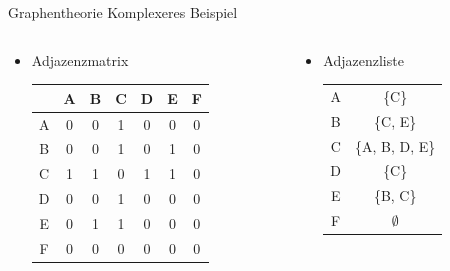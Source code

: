\documentclass[aspectratio=169]{beamer}
\begin{document}
\begin{frame}{Graphentheorie}
    \Large Komplexeres Beispiel \normalsize
    \vspace{0.5cm}
    \begin{columns}
        \begin{column}{0.4\textwidth}
            \begin{itemize}
                \item Adjazenzmatrix
                \begin{table}[]
                    \centering
                    \begin{tabular}{c|c c c c c c}
                         & A & B & C & D & E & F \\
                         \hline
                        A & 0 & 0 & 1 & 0 & 0 & 0 \\
                        B & 0 & 0 & 1 & 0 & 1 & 0 \\
                        C & 1 & 1 & 0 & 1 & 1 & 0 \\
                        D & 0 & 0 & 1 & 0 & 0 & 0 \\
                        E & 0 & 1 & 1 & 0 & 0 & 0 \\
                        F & 0 & 0 & 0 & 0 & 0 & 0 \\
                    \end{tabular}
                \end{table}
            \end{itemize}
        \end{column}
        \pause
        \begin{column}{0.3\textwidth}
            \begin{itemize}
                \item Adjazenzliste
                \begin{table}[]
                    \centering
                    \begin{tabular}{c|c}
                        A & \{C\} \\
                        B & \{C, E\} \\
                        C & \{A, B, D, E\} \\
                        D & \{C\} \\
                        E & \{B, C\} \\
                        F & $\emptyset$ \\
                    \end{tabular}
                \end{table}

\end{itemize}
\end{column}
\end{columns}
\end{frame}
\end{document}
